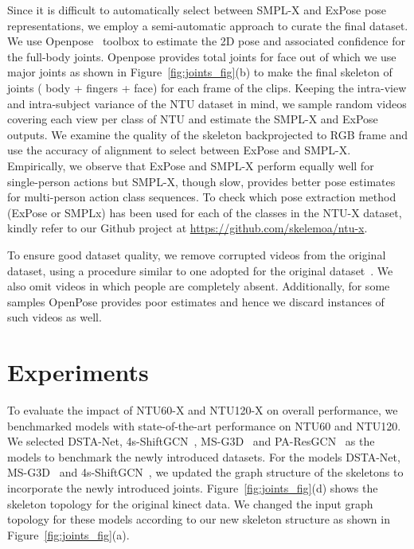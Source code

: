 \documentclass[sigconf,screen,prologue,table,dvipsnames]{acmart}
\begin{document}
Since it is difficult to automatically select between SMPL-X and ExPose pose representations, we employ a semi-automatic approach to curate the final dataset. We use Openpose~\cite{cao2018openpose} toolbox to estimate the 2D pose and associated confidence for the full-body joints. Openpose provides total  joints for face out of which we use  major joints as shown in Figure~\ref{fig:joints_fig}(b) to make the final skeleton of  joints ( body +  fingers +  face) for each frame of the clips. Keeping the intra-view and intra-subject variance of the NTU dataset in mind, we sample random videos covering each view per class of NTU and estimate the SMPL-X and ExPose outputs. We examine the quality of the skeleton backprojected to RGB frame and use the accuracy of alignment to select between ExPose and SMPL-X. Empirically, we observe that ExPose and SMPL-X perform equally well for single-person actions but SMPL-X, though slow, provides better pose estimates for multi-person action class sequences. To check which pose extraction method (ExPose or SMPLx) has been used for each of the classes in the NTU-X dataset, kindly refer to our Github project at \url{https://github.com/skelemoa/ntu-x}.


To ensure good dataset quality, we remove corrupted videos from the original dataset, using a procedure similar to one adopted for the original dataset~\cite{Shahroudy_2016_CVPR}. We also omit videos in which people are completely absent. Additionally, for some  samples  OpenPose provides poor estimates and hence we discard instances of such videos as well.



\section{Experiments}
\label{sec:experiments}

To evaluate the impact of NTU60-X and NTU120-X on overall performance, we benchmarked models with state-of-the-art performance on NTU60 and NTU120. We selected DSTA-Net\cite{dstanet_accv2020}, 4s-ShiftGCN~\cite{cheng2020shiftgcn}, MS-G3D~\cite{liu2020disentangling} and PA-ResGCN~\cite{song2020stronger} as the models to benchmark the newly introduced datasets. For the models DSTA-Net\cite{dstanet_accv2020}, MS-G3D~\cite{liu2020disentangling} and 4s-ShiftGCN~\cite{cheng2020shiftgcn}, we updated the graph structure of the skeletons to incorporate the newly introduced joints. Figure~\ref{fig:joints_fig}(d) shows the skeleton topology for the original kinect data. We changed the input graph topology for these models according to our new skeleton structure as shown in Figure~\ref{fig:joints_fig}(a).
\end{document}
